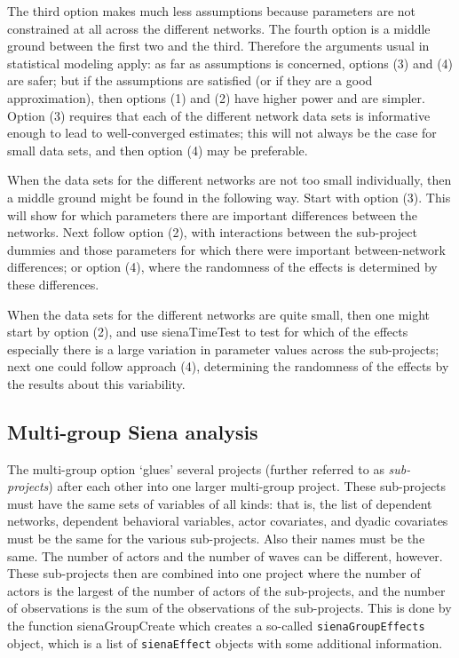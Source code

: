 \documentclass[a4paper,fleqn,11pt]{article}
\newcommand{\+}{\, + \,}
\newcommand{\sfn}[1]{\textsf{#1}}
\begin{document}
The third option makes much less assumptions because parameters are not
constrained at all across the different networks.
The fourth option is a middle ground between the first two and the third.
Therefore the arguments usual in statistical modeling apply:
as far as assumptions is concerned, options (3) and (4) are safer;
but if the assumptions are satisfied (or if they are a good approximation),
then options (1) and (2) have higher power and are simpler.
Option (3) requires that each of the different network data sets
is informative enough to lead to well-converged estimates;
this will not always be the case for small data sets,
and then option (4) may be preferable.

When the data sets for the different networks are not too small
individually,
then a middle ground might be found in the following way.
Start with option (3). This will show for which parameters there are
important differences between the networks.
Next follow option (2), with interactions between the sub-project dummies
and those parameters for which there were important between-network
differences; or option (4), where the randomness of the effects
is determined by these differences.

When the data sets for the different networks are quite small,
then one might start by option (2), and use \sfn{sienaTimeTest} to test
for which of the effects especially there is a large variation in 
parameter values across the sub-projects;
next one could follow approach (4), determining the randomness of the effects
by the results about this variability.

\subsection{Multi-group Siena analysis}
\label{S_multigroup}

The multi-group option `glues' several projects
(further referred to as \emph{sub-projects}) after each other
into one larger multi-group project.
These sub-projects
must have the same sets of variables of all kinds:
that is, the list of dependent networks, dependent behavioral variables,
actor covariates, and dyadic covariates must be the same
for the various sub-projects.
Also their names must be the same.
The number of actors
and the number of waves can be different, however.
These sub-projects then are combined into one project
where the number of actors is the largest of the number of
actors of the sub-projects, and the number of observations
is the sum of the observations of the sub-projects.
This is done by the function \textsf{sienaGroupCreate} which creates
a so-called \texttt{sienaGroupEffects} object, which is a list of
\texttt{sienaEffect} objects with some additional information.
\end{document}
